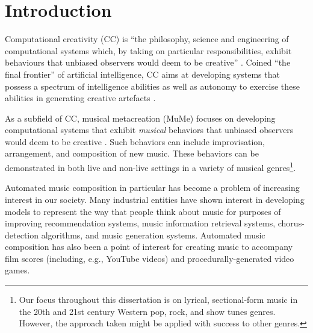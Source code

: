 \documentclass[phd,electronic,oneside,twosidetoc,letterpaper,chaptercenter,parttop,lol,lof,lot]{byumsphd}
\title{\Title}
\author{\Author}
\begin{document}
\maketitle
{}

\chapter{Introduction}

Computational creativity (CC) is ``the philosophy, science and engineering of computational systems which, by taking on particular responsibilities, exhibit behaviours that unbiased observers would deem to be creative'' \citep{colton2012computational}. Coined ``the final frontier'' of artificial intelligence, CC aims at developing systems that possess a spectrum of intelligence abilities as well as autonomy to exercise these abilities in generating creative artefacts \cite{Jennings2010DevelopingIntelligence}.

As a subfield of CC, musical metacreation (MuMe) focuses on developing computational systems that exhibit \emph{musical} behaviors that unbiased observers would deem to be creative \cite{Bodily2018MusicalFuture}. Such behaviors can include improvisation, arrangement, and composition of new music. These behaviors can be demonstrated in both live and non-live settings in a variety of musical genres\footnote{Our focus throughout this dissertation is on lyrical, sectional-form music in the 20th and 21st century Western pop, rock, and show tunes genres. However, the approach taken might be applied with success to other genres.}.

Automated music composition in particular has become a problem of increasing interest in our society. Many industrial entities have shown interest in developing models to represent the way that people think about music for purposes of improving recommendation systems, music information retrieval systems, chorus-detection algorithms, and music generation systems. Automated music composition has also been a point of interest for creating music to accompany film scores (including, e.g., YouTube videos) and procedurally-generated video games.
\end{document}
